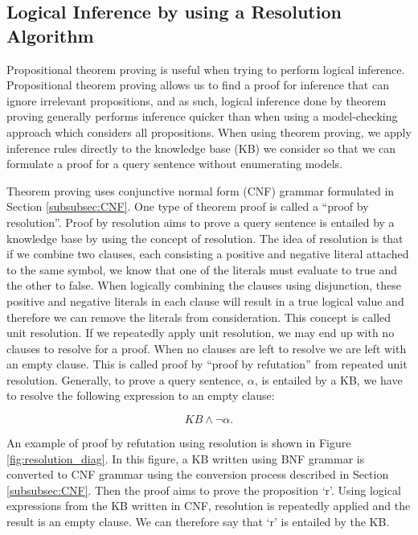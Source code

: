

\subsection{Logical Inference by using a Resolution Algorithm}
\label{subsec:Inference_Resolution}

Propositional theorem proving is useful when trying to perform logical inference. Propositional theorem proving allows us to find a proof for inference that can ignore irrelevant propositions, and as such, logical inference done by theorem proving generally performs inference quicker than when using a model-checking approach which considers all propositions. When using theorem proving, we apply inference rules directly to the knowledge base (KB) we consider so that we can formulate a proof for a query sentence without enumerating models.

Theorem proving uses conjunctive normal form (CNF) grammar formulated in Section \ref{subsubsec:CNF}. One type of theorem proof is called a ``proof by resolution''. Proof by resolution aims to prove a query sentence is entailed by a knowledge base by using the concept of resolution.
The idea of resolution is that if we combine two clauses, each consisting a positive and negative literal attached to the same symbol, we know that one of the literals must evaluate to true and the other to false. When logically combining the clauses using disjunction, these positive and negative literals in each clause will result in a true logical value and therefore we can remove the literals from consideration. This concept is called unit resolution. If we repeatedly apply unit resolution, we may end up with no clauses to resolve for a proof. When no clauses are left to resolve we are left with an empty clause. This is called proof by ``proof by refutation'' from repeated unit resolution. Generally, to prove a query sentence, $\alpha$, is entailed by a KB, we have to resolve the following expression to an empty clause:

\begin{equation}
	KB \wedge \neg \alpha.
	\label{eq:proof_refutation}
\end{equation}

An example of proof by refutation using resolution is shown in Figure \ref{fig:resolution_diag}. In this figure, a KB written using BNF grammar is converted to CNF grammar using the conversion process described in Section \ref{subsubsec:CNF}. Then the proof aims to prove the proposition `r'. Using logical expressions from the KB written in CNF, resolution is repeatedly applied and the result is an empty clause. We can therefore say that `r' is entailed by the KB.


